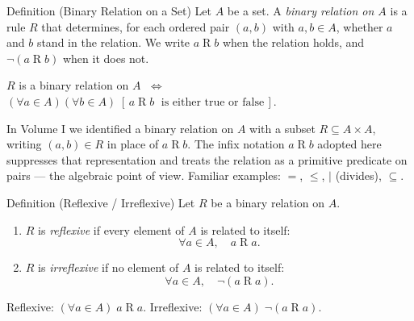 
\begin{definitionbox}{Definition (Binary Relation on a Set)}
\label{def:binary-relation}
Let $A$ be a set.
A \emph{binary relation on $A$} is a rule $R$ that determines,
for each ordered pair $(a, b)$ with $a, b \in A$, whether
$a$ and $b$ stand in the relation.
We write $a \mathrel{R} b$ when the relation holds, and
$\lnot(a \mathrel{R} b)$ when it does not.
\end{definitionbox}

\begin{remark}
$R$ is a binary relation on $A$
$\;\iff\;$
$(\forall a \in A)(\forall b \in A)\;
[\,a \mathrel{R} b \;\text{ is either true or false}\,]$.
\end{remark}

\begin{remark}
In Volume I we identified a binary relation on $A$ with a subset
$R \subseteq A \times A$, writing $(a,b) \in R$ in place of
$a \mathrel{R} b$.
The infix notation $a \mathrel{R} b$ adopted here suppresses that
representation and treats the relation as a primitive predicate on
pairs — the algebraic point of view.
Familiar examples: $=$, $\leq$, $\mid$ (divides), $\subseteq$.
\end{remark}


\begin{definitionbox}{Definition (Reflexive / Irreflexive)}
\label{def:rel-reflexive}
\label{def:rel-irreflexive}
Let $R$ be a binary relation on $A$.
\begin{enumerate}[label=(\roman*)]
  \item $R$ is \emph{reflexive} if every element of $A$ is related to itself:
        \[
          \forall a \in A,\quad a \mathrel{R} a.
        \]
  \item $R$ is \emph{irreflexive} if no element of $A$ is related to itself:
        \[
          \forall a \in A,\quad \lnot(a \mathrel{R} a).
        \]
\end{enumerate}
\end{definitionbox}

\begin{remark}
Reflexive: $(\forall a \in A)\; a \mathrel{R} a$.
\quad
Irreflexive: $(\forall a \in A)\; \lnot(a \mathrel{R} a)$.
\end{remark}

